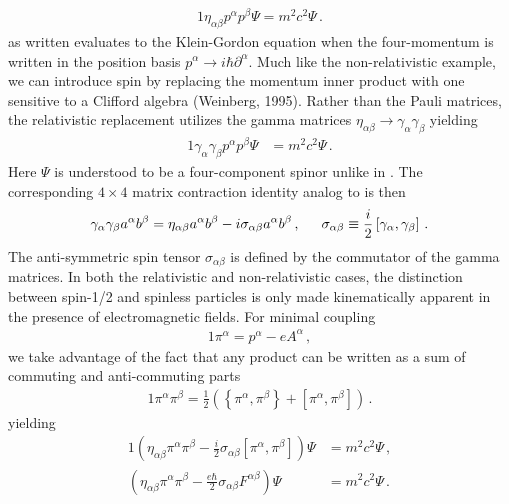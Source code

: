 \begin{alignat}{1}
	\label{analog:1} \eta_{\alpha\beta}p^{\alpha}p^{\beta}\Psi=m^{2}c^{2}\Psi\,.
\end{alignat}
 as written evaluates to the Klein-Gordon equation when the four-momentum is written in the position basis $p^{\alpha}\rightarrow i\hbar\partial^{\alpha}$. Much like the non-relativistic example, we can introduce spin by replacing the momentum inner product with one sensitive to a Clifford algebra (Weinberg, 1995). Rather than the Pauli matrices, the relativistic replacement utilizes the gamma matrices $\eta_{\alpha\beta}\rightarrow\gamma_{\alpha}\gamma_{\beta}$ yielding
\begin{alignat}{1}
	\label{eq:spin:03} \gamma_{\alpha}\gamma_{\beta}p^{\alpha}p^{\beta}\Psi&=m^{2}c^{2}\Psi\,.
\end{alignat}
Here $\Psi$ is understood to be a four-component spinor unlike in . The corresponding $4\times4$ matrix contraction identity analog to  is then
\begin{alignat}{1}
	\label{eq:spin:04} \gamma_{\alpha}\gamma_{\beta}a^{\alpha}b^{\beta}=\eta_{\alpha\beta}a^{\alpha}b^{\beta}-i\sigma_{\alpha\beta}a^{\alpha}b^{\beta}\,,\indent \sigma_{\alpha\beta}\equiv\frac{i}{2}\left[\gamma_{\alpha},\gamma_{\beta}\right]\,.
\end{alignat}
The anti-symmetric spin tensor $\sigma_{\alpha\beta}$ is defined by the commutator of the gamma matrices. In both the relativistic and non-relativistic cases, the distinction between spin-1/2 and spinless particles is only made kinematically apparent in the presence of electromagnetic fields. For minimal coupling
\begin{alignat}{1}
  \label{eq:spin:05} \pi^{\alpha}=p^{\alpha}-eA^{\alpha}\,,
\end{alignat}
we take advantage of the fact that any product can be written as a sum of commuting and anti-commuting parts
\begin{alignat}{1}
	\label{eq:spin:06} \pi^{\alpha}\pi^{\beta}=\frac{1}{2}\left(\left\{\pi^{\alpha},\pi^{\beta}\right\}+\left[\pi^{\alpha},\pi^{\beta}\right]\right)\,.
\end{alignat}
yielding
\begin{alignat}{1}
	\label{eq:spin:07a} \left(\eta_{\alpha\beta}\pi^{\alpha}\pi^{\beta}-\frac{i}{2}\sigma_{\alpha\beta}\left[\pi^{\alpha},\pi^{\beta}\right]\right)\Psi&=m^{2}c^{2}\Psi\,,\\
	\label{eq:spin:07b} \left(\eta_{\alpha\beta}\pi^{\alpha}\pi^{\beta}-\frac{e\hbar}{2}\sigma_{\alpha\beta}F^{\alpha\beta}\right)\Psi&=m^{2}c^{2}\Psi\,.
\end{alignat}
